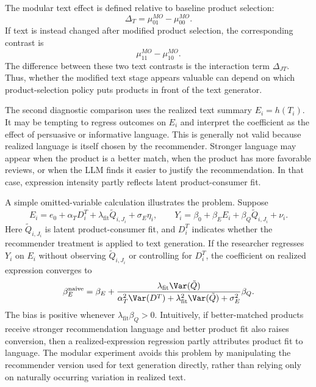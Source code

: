 \documentclass[11pt]{article}
\newcommand{\J}{J}
\newcommand{\Y}{Y}
\begin{document}
The modular text effect is defined relative to baseline product selection:
\begin{equation*}
\Delta_T = \mu_{01}^{MO} - \mu_{00}^{MO}.
\end{equation*}
If text is instead changed after modified product selection, the corresponding contrast is
\begin{equation*}
\mu_{11}^{MO} - \mu_{10}^{MO}.
\end{equation*}
The difference between these two text contrasts is the interaction term $\Delta_{JT}$. Thus, whether the modified text stage appears valuable can depend on which product-selection policy puts products in front of the text generator.

The second diagnostic comparison uses the realized text summary $E_i = h(T_i)$. It may be tempting to regress outcomes on $E_i$ and interpret the coefficient as the effect of persuasive or informative language. This is generally not valid because realized language is itself chosen by the recommender. Stronger language may appear when the product is a better match, when the product has more favorable reviews, or when the LLM finds it easier to justify the recommendation. In that case, expression intensity partly reflects latent product-consumer fit.

A simple omitted-variable calculation illustrates the problem. Suppose
\begin{equation*}
E_i = e_0 + \alpha_T D_i^T + \lambda_{\mathrm{fit}}\tilde{Q}_{i,\J_i} + \sigma_E\eta_i, \qquad \Y_i = \beta_0 + \beta_E E_i + \beta_Q \tilde{Q}_{i,\J_i} + \nu_i.
\end{equation*}
Here $\tilde{Q}_{i,\J_i}$ is latent product-consumer fit, and $D_i^T$ indicates whether the recommender treatment is applied to text generation. If the researcher regresses $\Y_i$ on $E_i$ without observing $\tilde{Q}_{i,\J_i}$ or controlling for $D_i^T$, the coefficient on realized expression converges to
\begin{equation}
\beta_E^{\mathrm{naive}} = \beta_E + \frac{\lambda_{\mathrm{fit}}\Var(\tilde{Q})}{\alpha_T^2\Var(D^T) + \lambda_{\mathrm{fit}}^2\Var(\tilde{Q}) + \sigma_E^2}\beta_Q.
\label{eq:naive-expression-bias}
\end{equation}
The bias is positive whenever $\lambda_{\mathrm{fit}}\beta_Q > 0$. Intuitively, if better-matched products receive stronger recommendation language and better product fit also raises conversion, then a realized-expression regression partly attributes product fit to language. The modular experiment avoids this problem by manipulating the recommender version used for text generation directly, rather than relying only on naturally occurring variation in realized text.
\end{document}
